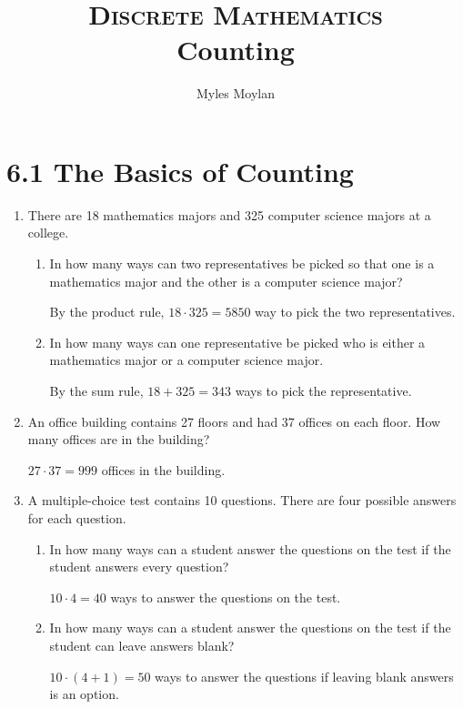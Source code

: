 \documentclass[11pt]{article}
\title{	
	\normalfont \normalsize 
	\textsc{Discrete Mathematics} \\
	\huge Counting \\
}
\author{Myles Moylan} %
\date{} %
\begin{document}
	
\maketitle

\section*{\textbf{6.1 The Basics of Counting}}
\begin{enumerate}[label=\textbf{\arabic*.}]
	\item There are 18 mathematics majors and 325 computer science majors at a college.
	
	\begin{enumerate}[label=\textbf{\alph*)}]
		\item In how many ways can two representatives be picked so that one is a mathematics major and the other is a computer science major?
		
		By the product rule, $18 \cdot 325 = 5850$ way to pick the two representatives.
		
		\item In how many ways can one representative be picked who is either a mathematics major or a computer science major.
		
		By the sum rule, $18 + 325 = 343$ ways to pick the representative.
	\end{enumerate}

	\item An office building contains 27 floors and had 37 offices on each floor. How many offices are in the building?
	
	$27 \cdot 37 = 999$ offices in the building.
	
	\item A multiple-choice test contains 10 questions. There are four possible answers for each question.
	
	\begin{enumerate}[label=\textbf{\alph*)}]
		\item In how many ways can a student answer the questions on the test if the student answers every question?
		
		$10 \cdot 4 = 40$ ways to answer the questions on the test.
		
		\item In how many ways can a student answer the questions on the test if the student can leave answers blank?
		
		$10 \cdot (4 + 1) = 50$ ways to answer the questions if leaving blank answers is an option.
	\end{enumerate}


\end{enumerate}
\end{document}
